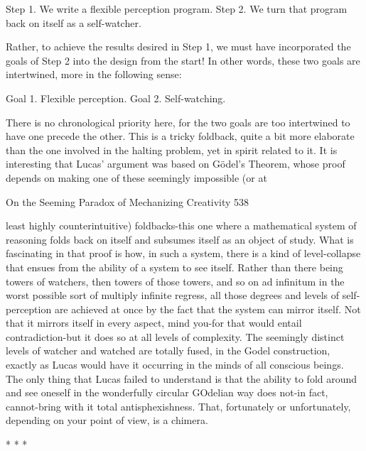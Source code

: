        Step 1. We write a flexible perception program.
       Step 2. We turn that program back on itself as a self-watcher.

Rather, to achieve the results desired in Step 1, we must have incorporated the goals
of Step 2 into the design from the start! In other words, these two goals are
intertwined, more in the following sense:

       Goal 1. Flexible perception.
       Goal 2. Self-watching.

There is no chronological priority here, for the two goals are too intertwined to have
one precede the other. This is a tricky foldback, quite a bit more elaborate than the
one involved in the halting problem, yet in spirit related to it.
       It is interesting that Lucas' argument was based on Gödel’s Theorem, whose
proof depends on making one of these seemingly impossible (or at




On the Seeming Paradox of Mechanizing Creativity                                   538

least highly counterintuitive) foldbacks-this one where a mathematical system of
reasoning folds back on itself and subsumes itself as an object of study. What is
fascinating in that proof is how, in such a system, there is a kind of level-collapse that
ensues from the ability of a system to see itself. Rather than there being towers of
watchers, then towers of those towers, and so on ad infinitum in the worst possible
sort of multiply infinite regress, all those degrees and levels of self-perception are
achieved at once by the fact that the system can mirror itself. Not that it mirrors itself
in every aspect, mind you-for that would entail contradiction-but it does so at all
levels of complexity.
        The seemingly distinct levels of watcher and watched are totally fused, in the
Godel construction, exactly as Lucas would have it occurring in the minds of all
conscious beings. The only thing that Lucas failed to understand is that the ability to
fold around and see oneself in the wonderfully circular GOdelian way does not-in
fact, cannot-bring with it total antisphexishness. That, fortunately or unfortunately,
depending on your point of view, is a chimera.

*   *   *

